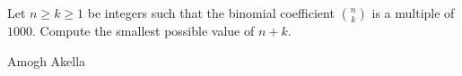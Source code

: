 Let $n \geq k \geq 1$ be integers such that the binomial coefficient $\binom nk$ is a multiple of $1000$. Compute the smallest possible value of $n + k$.

Amogh Akella
